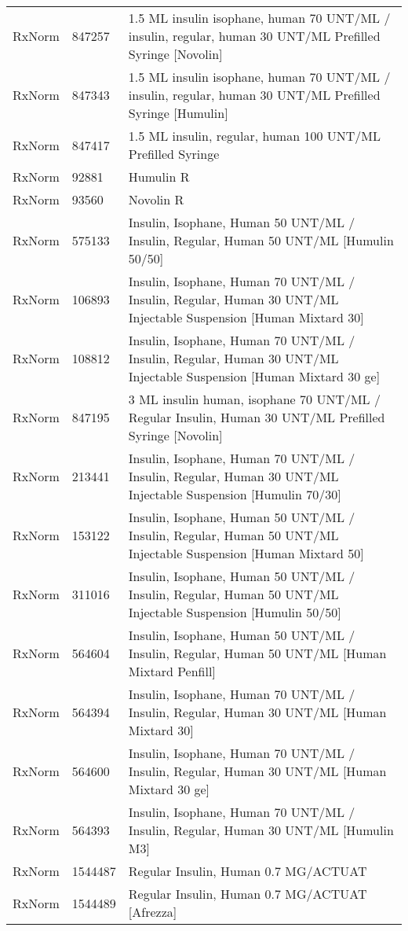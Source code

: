 \begin{longtable}{p{}p{}p{}}
  RxNorm & 847257 & 1.5 ML insulin isophane, human 70 UNT/ML / insulin, regular, human 30 UNT/ML Prefilled Syringe [Novolin] \\ 
  RxNorm & 847343 & 1.5 ML insulin isophane, human 70 UNT/ML / insulin, regular, human 30 UNT/ML Prefilled Syringe [Humulin] \\ 
  RxNorm & 847417 & 1.5 ML insulin, regular, human 100 UNT/ML Prefilled Syringe \\ 
  RxNorm & 92881 & Humulin R \\ 
  RxNorm & 93560 & Novolin R \\ 
  RxNorm & 575133 & Insulin, Isophane, Human 50 UNT/ML / Insulin, Regular, Human 50 UNT/ML [Humulin 50/50] \\ 
  RxNorm & 106893 & Insulin, Isophane, Human 70 UNT/ML / Insulin, Regular, Human 30 UNT/ML Injectable Suspension [Human Mixtard 30] \\ 
  RxNorm & 108812 & Insulin, Isophane, Human 70 UNT/ML / Insulin, Regular, Human 30 UNT/ML Injectable Suspension [Human Mixtard 30 ge] \\ 
  RxNorm & 847195 & 3 ML insulin human, isophane 70 UNT/ML / Regular Insulin, Human 30 UNT/ML Prefilled Syringe [Novolin] \\ 
  RxNorm & 213441 & Insulin, Isophane, Human 70 UNT/ML / Insulin, Regular, Human 30 UNT/ML Injectable Suspension [Humulin 70/30] \\ 
  RxNorm & 153122 & Insulin, Isophane, Human 50 UNT/ML / Insulin, Regular, Human 50 UNT/ML Injectable Suspension [Human Mixtard 50] \\ 
  RxNorm & 311016 & Insulin, Isophane, Human 50 UNT/ML / Insulin, Regular, Human 50 UNT/ML Injectable Suspension [Humulin 50/50] \\ 
  RxNorm & 564604 & Insulin, Isophane, Human 50 UNT/ML / Insulin, Regular, Human 50 UNT/ML [Human Mixtard Penfill] \\ 
  RxNorm & 564394 & Insulin, Isophane, Human 70 UNT/ML / Insulin, Regular, Human 30 UNT/ML [Human Mixtard 30] \\ 
  RxNorm & 564600 & Insulin, Isophane, Human 70 UNT/ML / Insulin, Regular, Human 30 UNT/ML [Human Mixtard 30 ge] \\ 
  RxNorm & 564393 & Insulin, Isophane, Human 70 UNT/ML / Insulin, Regular, Human 30 UNT/ML [Humulin M3] \\ 
  RxNorm & 1544487 & Regular Insulin, Human 0.7 MG/ACTUAT \\ 
  RxNorm & 1544489 & Regular Insulin, Human 0.7 MG/ACTUAT [Afrezza] \\ 

\end{longtable}
